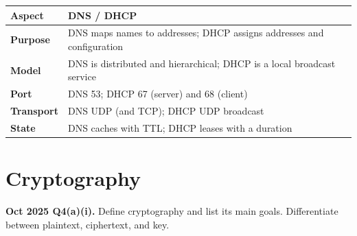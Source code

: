 \documentclass[11pt,a4paper]{article}
\begin{document}
\begin{center}\small
\begin{tabularx}{\textwidth}{>{\bfseries}p{} X}
\toprule Aspect & DNS / DHCP\\
\midrule
Purpose & DNS maps names to addresses; DHCP assigns addresses and configuration\\
Model & DNS is distributed and hierarchical; DHCP is a local broadcast service\\
Port & DNS 53; DHCP 67 (server) and 68 (client)\\
Transport & DNS UDP (and TCP); DHCP UDP broadcast\\
State & DNS caches with TTL; DHCP leases with a duration\\
\bottomrule
\end{tabularx}
\end{center}

\section{Cryptography}

\begin{pyqbox}
\textbf{Oct 2025 Q4(a)(i).} Define cryptography and list its main goals. Differentiate between plaintext, ciphertext, and key.
\end{pyqbox}
\end{document}
